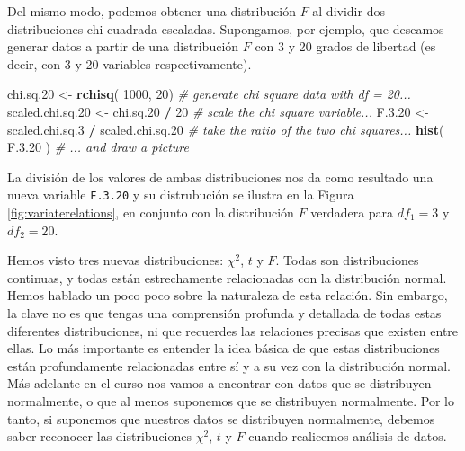 \documentclass[spanish,]{book}
\newenvironment{Shaded}{\begin{snugshade}}{\end{snugshade}}
\newcommand{\KeywordTok}[1]{\textcolor[rgb]{0.13,0.29,0.53}{\textbf{#1}}}
\newcommand{\DecValTok}[1]{\textcolor[rgb]{0.00,0.00,0.81}{#1}}
\newcommand{\FloatTok}[1]{\textcolor[rgb]{0.00,0.00,0.81}{#1}}
\newcommand{\StringTok}[1]{\textcolor[rgb]{0.31,0.60,0.02}{#1}}
\newcommand{\CommentTok}[1]{\textcolor[rgb]{0.56,0.35,0.01}{\textit{#1}}}
\newcommand{\OperatorTok}[1]{\textcolor[rgb]{0.81,0.36,0.00}{\textbf{#1}}}
\newcommand{\NormalTok}[1]{#1}
\begin{document}
Del mismo modo, podemos obtener una distribución \(F\) al dividir dos
distribuciones chi-cuadrada escaladas. Supongamos, por ejemplo, que
deseamos generar datos a partir de una distribución \(F\) con 3 y 20
grados de libertad (es decir, con 3 y 20 variables respectivamente).

\begin{Shaded}
\begin{Highlighting}[]
\NormalTok{chi.sq.}\DecValTok{20}\NormalTok{ <-}\StringTok{ }\KeywordTok{rchisq}\NormalTok{( }\DecValTok{1000}\NormalTok{, }\DecValTok{20}\NormalTok{)                 }\CommentTok{# generate chi square data with df = 20...}
\NormalTok{scaled.chi.sq.}\DecValTok{20}\NormalTok{ <-}\StringTok{ }\NormalTok{chi.sq.}\DecValTok{20} \OperatorTok{/}\StringTok{ }\DecValTok{20}             \CommentTok{# scale the chi square variable...}
\NormalTok{F.}\FloatTok{3.20}\NormalTok{ <-}\StringTok{  }\NormalTok{scaled.chi.sq.}\DecValTok{3}  \OperatorTok{/}\StringTok{ }\NormalTok{scaled.chi.sq.}\DecValTok{20} \CommentTok{# take the ratio of the two chi squares...}
\KeywordTok{hist}\NormalTok{( F.}\FloatTok{3.20}\NormalTok{ )                                 }\CommentTok{# ... and draw a picture}
\end{Highlighting}
\end{Shaded}

La división de los valores de ambas distribuciones nos da como resultado
una nueva variable \texttt{F.3.20} y su distrubución se ilustra en la
Figura \ref{fig:variaterelations}, en conjunto con la distribución \(F\)
verdadera para \(df_1 = 3\) y \(df_2 = 20\).

Hemos visto tres nuevas distribuciones: \(\chi^2\), \(t\) y \(F\). Todas
son distribuciones continuas, y todas están estrechamente relacionadas
con la distribución normal. Hemos hablado un poco poco sobre la
naturaleza de esta relación. Sin embargo, la clave no es que tengas una
comprensión profunda y detallada de todas estas diferentes
distribuciones, ni que recuerdes las relaciones precisas que existen
entre ellas. Lo más importante es entender la idea básica de que estas
distribuciones están profundamente relacionadas entre sí y a su vez con
la distribución normal. Más adelante en el curso nos vamos a encontrar
con datos que se distribuyen normalmente, o que al menos suponemos que
se distribuyen normalmente. Por lo tanto, si suponemos que nuestros
datos se distribuyen normalmente, debemos saber reconocer las
distribuciones \(\chi^2\), \(t\) y \(F\) cuando realicemos análisis de
datos.
\end{document}
